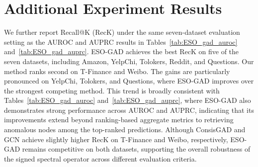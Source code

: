 \section{Additional Experiment Results}\label{app:additional}

We further report Recall@K (RecK) under the same seven-dataset evaluation setting as the AUROC and AUPRC results in Tables~\ref{tab:ESO_gad_auroc} and~\ref{tab:ESO_gad_auprc}.
ESO-GAD achieves the best RecK on five of the seven datasets, including Amazon, YelpChi, Tolokers, Reddit, and Questions.
Our method ranks second on T-Finance and Weibo. The gains are particularly pronounced on YelpChi, Tolokers, and Questions, where ESO-GAD improves over the strongest competing method.
This trend is broadly consistent with Tables~\ref{tab:ESO_gad_auroc} and~\ref{tab:ESO_gad_auprc}, where ESO-GAD also demonstrates strong performance across AUROC and AUPRC, indicating that its improvements extend beyond ranking-based aggregate metrics to retrieving anomalous nodes among the top-ranked predictions.
Although ConsisGAD and GCN achieve slightly higher RecK on T-Finance and Weibo, respectively, ESO-GAD remains competitive on both datasets, supporting the overall robustness of the signed spectral operator across different evaluation criteria.